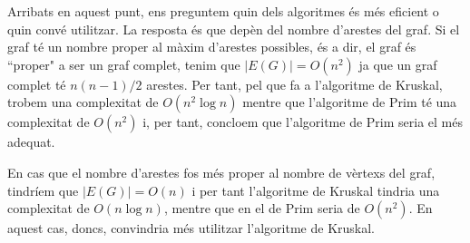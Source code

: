 \documentclass{article}
\begin{document}
Arribats en aquest punt, ens preguntem quin dels algoritmes és més eficient o quin convé utilitzar. La resposta és que depèn del nombre d’arestes del graf. Si el graf té un nombre proper al màxim d'arestes possibles, és a dir, el graf és ``proper" a ser un graf complet, tenim que $|E(G)|= O(n^2)$ ja que un graf complet té $n(n-1)/2$ arestes. Per tant, pel que fa a l’algoritme de Kruskal, trobem una complexitat de $O(n^2\log n)$ mentre que l’algoritme de Prim té una complexitat de $O(n^2)$ i, per tant, concloem que l’algoritme de Prim seria el més adequat.\par
En cas que el nombre d’arestes fos més proper al nombre de vèrtexs del graf, tindríem que $|E(G)|=O(n)$ i per tant l’algoritme de Kruskal tindria una complexitat de $O(n\log n)$, mentre que en el de Prim seria de $O(n^2)$. En aquest cas, doncs, convindria més utilitzar l’algoritme de Kruskal. \cite{6}

\newpage
\printbibliography[heading=bibintoc,title={Referències}]
\end{document}
